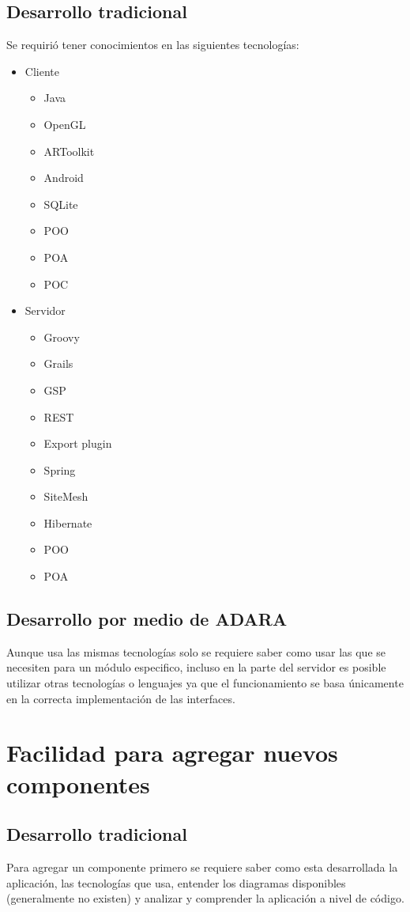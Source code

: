 \documentclass[12pt,a4paper,spanish,openany]{book}
\begin{document}
\subsection{Desarrollo tradicional}
Se requirió tener conocimientos en las siguientes tecnologías:
\begin{itemize}
  \item Cliente
  \begin{itemize}
    \item Java
    \item OpenGL
    \item ARToolkit
    \item Android
    \item SQLite
    \item POO
    \item POA
    \item POC
  \end{itemize}
 \item Servidor
  \begin{itemize}
    \item Groovy
    \item Grails
    \item GSP
    \item REST
    \item Export plugin
    \item Spring
    \item SiteMesh
    \item Hibernate
    \item POO
    \item POA
  \end{itemize}
\end{itemize}

\subsection{Desarrollo por medio de ADARA}
Aunque usa las mismas tecnologías solo se requiere saber como usar las que se
necesiten para un módulo especifico, incluso en la parte del servidor es posible
utilizar otras tecnologías o lenguajes ya que el funcionamiento se basa
únicamente en la correcta implementación de las interfaces.



\section{Facilidad para agregar nuevos componentes}
\subsection{Desarrollo tradicional}
Para agregar un componente primero se requiere saber como esta desarrollada la
aplicación, las tecnologías que usa, entender los diagramas disponibles
(generalmente no existen) y analizar y comprender la aplicación a nivel de
código.
\end{document}
